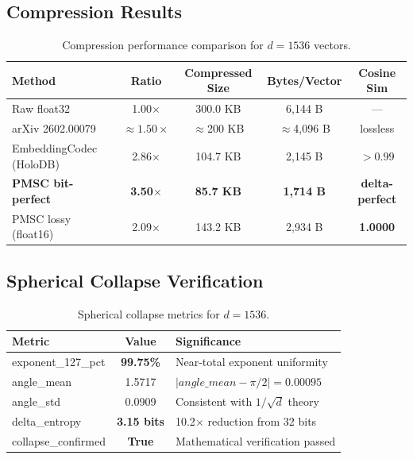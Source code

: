 \documentclass[11pt,a4paper]{article}
\begin{document}
\subsection{Compression Results}
\begin{table}[h]
\centering
\begin{tabular}{lcccc}
\toprule
\textbf{Method} & \textbf{Ratio} & \textbf{Compressed Size} & \textbf{Bytes/Vector} & \textbf{Cosine Sim} \\
\midrule
Raw float32 & 1.00$\times$ & 300.0 KB & 6,144 B & --- \\
arXiv 2602.00079 & $\approx 1.50\times$ & $\approx$200 KB & $\approx$4,096 B & lossless \\
EmbeddingCodec (HoloDB) & 2.86$\times$ & 104.7 KB & 2,145 B & $>0.99$ \\
\textbf{PMSC bit-perfect} & \textbf{3.50$\times$} & \textbf{85.7 KB} & \textbf{1,714 B} & \textbf{delta-perfect} \\
PMSC lossy (float16) & 2.09$\times$ & 143.2 KB & 2,934 B & \textbf{1.0000} \\
\bottomrule
\end{tabular}
\caption{Compression performance comparison for $d=1536$ vectors.}
\label{tab:compression_results}
\end{table}

\subsection{Spherical Collapse Verification}
\begin{table}[h]
\centering
\begin{tabular}{lcl}
\toprule
\textbf{Metric} & \textbf{Value} & \textbf{Significance} \\
\midrule
exponent\_127\_pct & \textbf{99.75\%} & Near-total exponent uniformity \\
angle\_mean & 1.5717 & $|angle\_mean - \pi/2| = 0.00095$ \\
angle\_std & 0.0909 & Consistent with $1/\sqrt{d}$ theory \\
delta\_entropy & \textbf{3.15 bits} & 10.2$\times$ reduction from 32 bits \\
collapse\_confirmed & \textbf{True} & Mathematical verification passed \\
\bottomrule
\end{tabular}
\caption{Spherical collapse metrics for $d=1536$.}
\label{tab:collapse_metrics}
\end{table}
\end{document}

